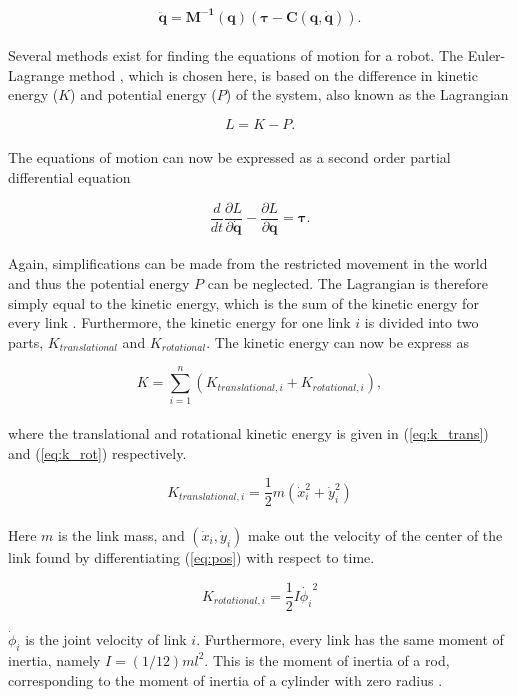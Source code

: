 \begin{equation}\label{eq:eom_qdd}
    \mathbf{\ddot{q}} = \mathbf{M^{-1}(q)}( \boldsymbol{\tau} - \mathbf{C(q, \dot{q})}).
\end{equation}
\\
Several methods exist for finding the equations of motion for a robot. The Euler-Lagrange method \cite{lynch2017modern}, which  is chosen here, is based on the difference in kinetic energy ($K$) and potential energy ($P$) of the system, also known as the Lagrangian

\begin{equation}
    L = K - P.
\end{equation}
\\
The equations of motion can now be expressed as a second order partial differential equation

\begin{equation} \label{eq:Lagrange}
    \frac{d}{d t} \frac{\partial L}{\partial \mathbf{\dot{q}}} - \frac{\partial L}{\partial \mathbf{q}} = \boldsymbol{\tau}.
\end{equation}
\\
Again, simplifications can be made from the restricted movement in the world and thus the potential energy $P$ can be neglected. The Lagrangian is therefore simply equal to the kinetic energy, which is the sum of the kinetic energy for every link \cite{rezapour2014path}. Furthermore, the kinetic energy for one link $i$ is divided into two parts, $K_{translational}$ and $K_{rotational}$.
The kinetic energy can now be express as

\begin{equation}
    K = \sum_{i=1}^{n} (K_{translational,i} + K_{rotational,i}),
\end{equation}
\\
where the translational and rotational kinetic energy is given in (\ref{eq:k_trans}) and (\ref{eq:k_rot}) respectively.

\begin{equation} \label{eq:k_trans}
    K_{translational,i} = \frac{1}{2} m (\dot{x}_i^2 + \dot{y}_i^2)
\end{equation}
\\
Here $m$ is the link mass, and $(\dot{x}_i, \dot{y}_i)$ make out the velocity of the center of the link found by differentiating (\ref{eq:pos}) with respect to time. 

\begin{equation} \label{eq:k_rot}
    K_{rotational,i} = \frac{1}{2}I\dot{\phi_i}^2
\end{equation}
\\
$\dot{\phi}_i$ is the joint velocity of link $i$. Furthermore, every link has the same moment of inertia, namely $I = (1/12)ml^2$. This is the moment of inertia of a rod, corresponding to the moment of inertia of a cylinder with zero radius \cite{lynch2017modern}.


